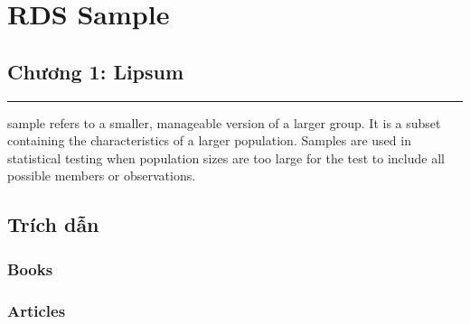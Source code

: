 \documentclass[11pt,fleqn]{book} %
\begin{document}
	\pagestyle{empty} %
	
	\tableofcontents %
	
	\cleardoublepage %
	
	\pagestyle{fancy} %
	
	
	\part{RDS Sample}
	
	
	\chapter{Chương 1: Lipsum}
	\hrule
	\vspace*{2cm}
	\normalsize
	 sample refers to a smaller, manageable version of a larger group. It is a subset containing the characteristics of a larger population. Samples are used in statistical testing when population sizes are too large for the test to include all possible members or observations. 
	\pagebreak
	
	
	
	
	\chapter*{Trích dẫn}
	\section*{Books}
	\printbibliography[heading=bibempty,type=book]
	\section*{Articles}
	\printbibliography[heading=bibempty,type=article]
	
	
	\cleardoublepage
	\setlength{\columnsep}{0.75cm}
	\printindex
	
\end{document}
